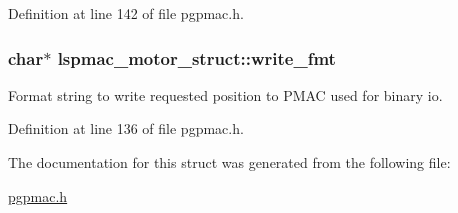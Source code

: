 Definition at line 142 of file pgpmac.\-h.

\hypertarget{structlspmac__motor__struct_a70291ddfe7994c0bec7fc2287cb6dd89}{
\subsubsection[{write\-\_\-fmt}]{\setlength{\rightskip}{0pt plus 5cm}char$\ast$ lspmac\-\_\-motor\-\_\-struct\-::write\-\_\-fmt}}\label{structlspmac__motor__struct_a70291ddfe7994c0bec7fc2287cb6dd89}


Format string to write requested position to P\-M\-A\-C used for binary io. 



Definition at line 136 of file pgpmac.\-h.



The documentation for this struct was generated from the following file\-:\begin{DoxyCompactItemize}
\item 
\hyperlink{pgpmac_8h}{pgpmac.\-h}\end{DoxyCompactItemize}
